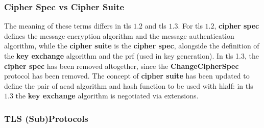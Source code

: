 \documentclass{llncs}
\begin{document}
\subsubsection{Cipher Spec vs Cipher Suite}

The meaning of these terms differs in \gls{tls} $1.2$ and \gls{tls} $1.3$. For \gls{tls} $1.2$,
\textbf{cipher spec} defines the message encryption algorithm and the message
authentication algorithm, while the \textbf{cipher suite} is the \textbf{cipher spec},
alongside the definition of the \textbf{key exchange} algorithm and the \gls{prf} (used in key generation). In \gls{tls} 1.3, the
 \textbf{cipher spec} has been removed altogether, since the  \textbf{ChangeCipherSpec}
 protocol has been removed. The concept of \textbf{cipher suite} has been updated
 to define the pair of \gls{aead} algorithm and hash function to be used with
 \gls{hkdf}: in \gls{tls} $1.3$ the  \textbf{key exchange} algorithm is negotiated via
 extensions.

\subsubsection{TLS (Sub)Protocols}
\end{document}

